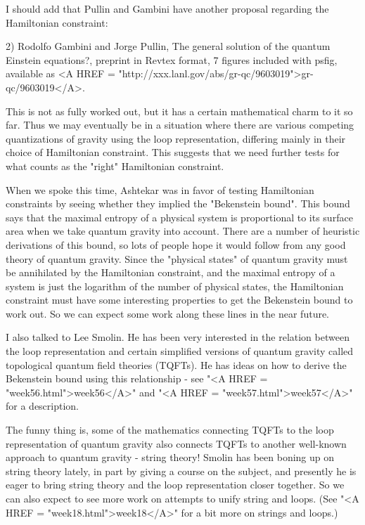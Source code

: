 I should add that Pullin and Gambini have another proposal regarding the
Hamiltonian constraint:

2) Rodolfo Gambini and Jorge Pullin, The general solution of the quantum
Einstein equations?, preprint in Revtex format, 7 figures included with
psfig, available as <A HREF = "http://xxx.lanl.gov/abs/gr-qc/9603019">gr-qc/9603019</A>.  

This is not as fully worked out, but it has a certain mathematical charm
to it so far.  Thus we may eventually be in a situation where there are
various competing quantizations of gravity using the loop
representation, differing mainly in their choice of Hamiltonian
constraint.  This suggests that we need further tests for what counts as
the "right" Hamiltonian constraint.  

When we spoke this time, Ashtekar was in favor of testing Hamiltonian
constraints by seeing whether they implied the "Bekenstein bound".  This
bound says that the maximal entropy of a physical system is proportional
to its surface area when we take quantum gravity into account.  There
are a number of heuristic derivations of this bound, so lots of people
hope it would follow from any good theory of quantum gravity.  Since the
"physical states" of quantum gravity must be annihilated by the
Hamiltonian constraint, and the maximal entropy of a system is just the
logarithm of the number of physical states, the Hamiltonian constraint
must have some interesting properties to get the Bekenstein bound to
work out.  So we can expect some work along these lines in the near
future.

I also talked to Lee Smolin.  He has been very interested in the
relation between the loop representation and certain simplified versions
of quantum gravity called topological quantum field theories (TQFTs).
He has ideas on how to derive the Bekenstein bound using this
relationship - see "<A HREF = "week56.html">week56</A>" and "<A HREF = "week57.html">week57</A>" for a description.

The funny thing is, some of the mathematics connecting TQFTs to the
loop representation of quantum gravity also connects TQFTs to another
well-known approach to quantum gravity - string theory!  Smolin has
been boning up on string theory lately, in part by giving a course on
the subject, and presently he is eager to bring string theory and the
loop representation closer together.  So we can also expect to see more
work on attempts to unify string and loops.  (See "<A HREF = "week18.html">week18</A>" for a bit more
on strings and loops.)


